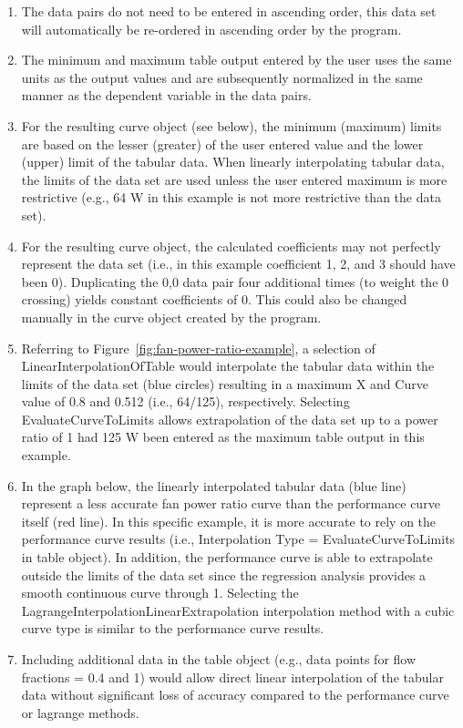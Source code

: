 \begin{enumerate}
\item The data pairs do not need to be entered in ascending order, this data set will automatically be re-ordered in ascending order by the program.
\item The minimum and maximum table output entered by the user uses the same units as the output values and are subsequently normalized in the same manner as the dependent variable in the data pairs.
\item For the resulting curve object (see below), the minimum (maximum) limits are based on the lesser (greater) of the user entered value and the lower (upper) limit of the tabular data. When linearly interpolating tabular data, the limits of the data set are used unless the user entered maximum is more restrictive (e.g., 64 W in this example is not more restrictive than the data set).
\item For the resulting curve object, the calculated coefficients may not perfectly represent the data set (i.e., in this example coefficient 1, 2, and 3 should have been 0). Duplicating the 0,0 data pair four additional times (to weight the 0 crossing) yields constant coefficients of 0. This could also be changed manually in the curve object created by the program.
\item Referring to Figure~\ref{fig:fan-power-ratio-example}, a selection of LinearInterpolationOfTable would interpolate the tabular data within the limits of the data set (blue circles) resulting in a maximum X and Curve value of 0.8 and 0.512 (i.e., 64/125), respectively. Selecting EvaluateCurveToLimits allows extrapolation of the data set up to a power ratio of 1 had 125 W been entered as the maximum table output in this example.
\item In the graph below, the linearly interpolated tabular data (blue line) represent a less accurate fan power ratio curve than the performance curve itself (red line). In this specific example, it is more accurate to rely on the performance curve results (i.e., Interpolation Type = EvaluateCurveToLimits in table object). In addition, the performance curve is able to extrapolate outside the limits of the data set since the regression analysis provides a smooth continuous curve through 1. Selecting the LagrangeInterpolationLinearExtrapolation interpolation method with a cubic curve type is similar to the performance curve results.
\item Including additional data in the table object (e.g., data points for flow fractions = 0.4 and 1) would allow direct linear interpolation of the tabular data without significant loss of accuracy compared to the performance curve or lagrange methods.
\end{enumerate}

